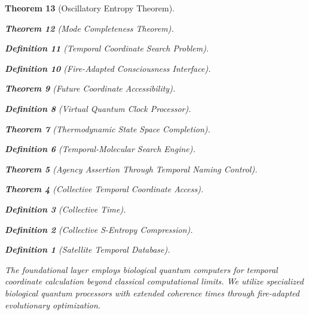 \documentclass[12pt,a4paper]{article}
\newtheorem{theorem}{Theorem}[section]
\newtheorem{definition}[theorem]{Definition}
\begin{document}
\begin{theorem}[Oscillatory Entropy Theorem]
\begin{theorem}[Mode Completeness Theorem]
\begin{enumerate}
\begin{definition}[Temporal Coordinate Search Problem]
\begin{algorithm}
\begin{definition}[Fire-Adapted Consciousness Interface]
\begin{theorem}[Future Coordinate Accessibility]
\begin{definition}[Virtual Quantum Clock Processor]
\begin{itemize}
\begin{itemize}
\begin{theorem}[Thermodynamic State Space Completion]
\begin{definition}[Temporal-Molecular Search Engine]
\begin{theorem}[Agency Assertion Through Temporal Naming Control]
\begin{remark}
\begin{theorem}[Collective Temporal Coordinate Access]
\begin{definition}[Collective Time]
\begin{definition}[Collective S-Entropy Compression]
\begin{definition}[Satellite Temporal Database]
\begin{algorithm}
\begin{table}[h]
{The foundational layer employs biological quantum computers for temporal coordinate calculation beyond classical computational limits. We utilize specialized biological quantum processors with extended coherence times through fire-adapted evolutionary optimization.

\begin{figure}[H]
\centering
{}
\end{figure}}
\end{table}
\end{algorithm}
\end{definition}
\end{definition}
\end{definition}
\end{theorem}
\end{remark}
\end{theorem}
\end{definition}
\end{theorem}
\end{itemize}
\end{itemize}
\end{definition}
\end{theorem}
\end{definition}
\end{algorithm}
\end{definition}
\end{enumerate}
\end{theorem}
\end{theorem}
\end{document}
